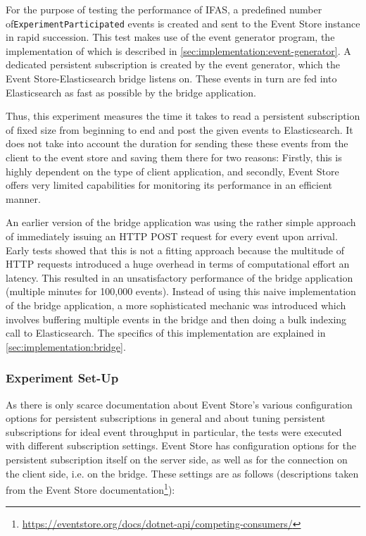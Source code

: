 For the purpose of testing the performance of \ac{IFAS}, a predefined number of\linebreak \texttt{ExperimentParticipated} events is created and sent to the Event Store instance in rapid succession.
This test makes use of the event generator program, the implementation of which is described in \cref{sec:implementation:event-generator}.
A dedicated persistent subscription is created by the event generator, which the Event Store-Elasticsearch bridge listens on.
These events in turn are fed into Elasticsearch as fast as possible by the bridge application.

Thus, this experiment measures the time it takes to read a persistent subscription of fixed size from beginning to end and post the given events to Elasticsearch.
It does not take into account the duration for sending these these events from the client to the event store and saving them there for two reasons:
Firstly, this is highly dependent on the type of client application, and secondly, Event Store offers very limited capabilities for monitoring its performance in an efficient manner.

An earlier version of the bridge application was using the rather simple approach of immediately issuing an \ac{HTTP} POST request for every event upon arrival.
Early tests showed that this is not a fitting approach because the multitude of HTTP requests introduced a huge overhead in terms of computational effort an latency.
This resulted in an unsatisfactory performance of the bridge application (multiple minutes for 100,000 events).
Instead of using this naive implementation of the bridge application, a more sophisticated mechanic was introduced which involves buffering multiple events in the bridge and then doing a bulk indexing call to Elasticsearch.
The specifics of this implementation are explained in \cref{sec:implementation:bridge}.

\subsubsection{Experiment Set-Up}

As there is only scarce documentation about Event Store's various configuration options for persistent subscriptions in general and about tuning persistent subscriptions for ideal event throughput in particular, the tests were executed with different subscription settings.
Event Store has configuration options for the persistent subscription itself on the server side, as well as for the connection on the client side, i.e. on the bridge.
These settings are as follows (descriptions taken from the Event Store documentation\footnote{\url{https://eventstore.org/docs/dotnet-api/competing-consumers/}}):

